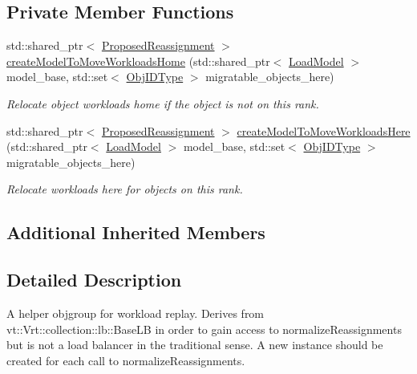 \subsection*{Private Member Functions}
\begin{DoxyCompactItemize}
\item 
std\+::shared\+\_\+ptr$<$ \hyperlink{structvt_1_1vrt_1_1collection_1_1balance_1_1_proposed_reassignment}{Proposed\+Reassignment} $>$ \hyperlink{structvt_1_1vrt_1_1collection_1_1balance_1_1replay_1_1_workload_data_migrator_a7885b36a6a51726a5aa9a9c1676d8721}{create\+Model\+To\+Move\+Workloads\+Home} (std\+::shared\+\_\+ptr$<$ \hyperlink{structvt_1_1vrt_1_1collection_1_1balance_1_1_load_model}{Load\+Model} $>$ model\+\_\+base, std\+::set$<$ \hyperlink{structvt_1_1vrt_1_1collection_1_1lb_1_1_base_l_b_a790b22acf448880599724749cdc4e9b3}{Obj\+I\+D\+Type} $>$ migratable\+\_\+objects\+\_\+here)
\begin{DoxyCompactList}\small\item\em Relocate object workloads home if the object is not on this rank. \end{DoxyCompactList}\item 
std\+::shared\+\_\+ptr$<$ \hyperlink{structvt_1_1vrt_1_1collection_1_1balance_1_1_proposed_reassignment}{Proposed\+Reassignment} $>$ \hyperlink{structvt_1_1vrt_1_1collection_1_1balance_1_1replay_1_1_workload_data_migrator_a43a68362596ecf6ea57040edad58d830}{create\+Model\+To\+Move\+Workloads\+Here} (std\+::shared\+\_\+ptr$<$ \hyperlink{structvt_1_1vrt_1_1collection_1_1balance_1_1_load_model}{Load\+Model} $>$ model\+\_\+base, std\+::set$<$ \hyperlink{structvt_1_1vrt_1_1collection_1_1lb_1_1_base_l_b_a790b22acf448880599724749cdc4e9b3}{Obj\+I\+D\+Type} $>$ migratable\+\_\+objects\+\_\+here)
\begin{DoxyCompactList}\small\item\em Relocate workloads here for objects on this rank. \end{DoxyCompactList}\end{DoxyCompactItemize}
\subsection*{Additional Inherited Members}


\subsection{Detailed Description}
A helper objgroup for workload replay. Derives from {\ttfamily vt\+::\+Vrt\+::collection\+::lb\+::\+Base\+LB} in order to gain access to normalize\+Reassignments but is not a load balancer in the traditional sense. A new instance should be created for each call to normalize\+Reassignments. 

